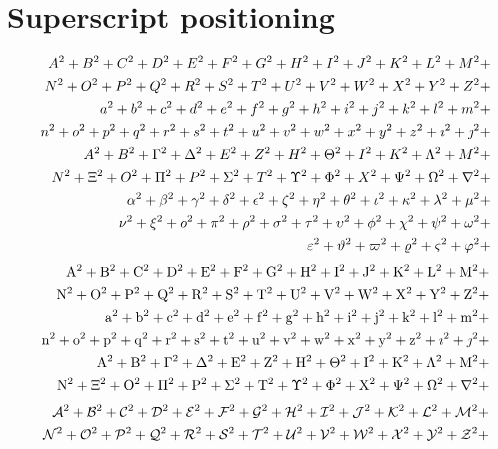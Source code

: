 \documentclass[fleqn]{article}
\def\test#1{#1}
\def\testupperi{%
  \test A \test B \test C \test D \test E \test F \test G \test H
  \test I \test J \test K \test L \test M }
\def\testupperii{%
  \test N \test O \test P \test Q \test R \test S \test T \test U
  \test V \test W \test X \test Y \test Z }
\def\testloweri{%
  \test a \test b \test c \test d \test e \test f \test g \test h
  \test i \test j \test k \test l \test m }
\def\testlowerii{%
  \test n \test o \test p \test q \test r \test s \test t \test u
  \test v \test w \test x \test y \test z 
  \test\imath \test\jmath }
\def\testupgreeki{%
  \test A \test B \test\Gamma \test\Delta \test E \test Z \test H
  \test\Theta \test I \test K \test\Lambda \test M }
\def\testupgreekii{%
  \test N \test\Xi \test O \test\Pi \test P \test\Sigma \test T
  \test\Upsilon \test\Phi \test X \test\Psi \test\Omega 
  \test\nabla }
\def\testlowgreeki{%
  \test\alpha \test\beta \test\gamma \test\delta \test\epsilon
  \test\zeta \test\eta \test\theta \test\iota \test\kappa \test\lambda
  \test\mu }
\def\testlowgreekii{%
  \test\nu \test\xi \test o \test\pi \test\rho \test\sigma \test\tau
  \test\upsilon \test\phi \test\chi \test\psi \test\omega }
\def\testlowgreekiii{%
  \test\varepsilon \test\vartheta \test\varpi \test\varrho
  \test\varsigma \test\varphi}
\begin{document}
\clearpage
\section{Superscript positioning}

\def\test#1{#1^{2}+}%
\begin{eqnarray*}
  && {\testupperi}\\
  && {\testupperii}\\
  && {\testloweri}\\ 
  && {\testlowerii}\\ 
  && {\testupgreeki}\\
  && {\testupgreekii}\\
  && {\testlowgreeki}\\
  && {\testlowgreekii}\\
  && {\testlowgreekiii}
\end{eqnarray*}%
%
\def\test#1{\mathrm{#1}^{2}+}%
\begin{eqnarray*}
  && {\testupperi}\\
  && {\testupperii}\\
  && {\testloweri}\\ 
  && {\testlowerii}\\ 
  && {\testupgreeki}\\
  && {\testupgreekii}
\end{eqnarray*}%
%
%
%
\def\test#1{\mathcal{#1}^{2}+}%
\begin{eqnarray*}
  && {\testupperi}\\
  && {\testupperii}
\end{eqnarray*}%
\end{document}

